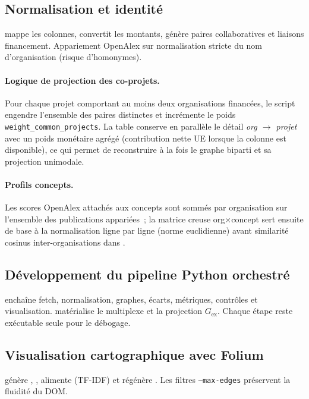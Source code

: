 \documentclass[12pt,a4paper,oneside]{article}
\begin{document}
\subsection{Normalisation et identité}
 mappe les colonnes, convertit les montants, génère paires collaboratives et liaisons financement. Appariement OpenAlex sur normalisation stricte du nom d'organisation (risque d'homonymes).

\paragraph{Logique de projection des co-projets.}
Pour chaque projet comportant au moins deux organisations financées, le script engendre l'ensemble des paires distinctes et incrémente le poids \texttt{weight\_common\_projects}. La table  conserve en parallèle le détail \emph{org $\rightarrow$ projet} avec un poids monétaire agrégé (contribution nette UE lorsque la colonne est disponible), ce qui permet de reconstruire à la fois le graphe biparti et sa projection unimodale.

\paragraph{Profils concepts.}
Les scores OpenAlex attachés aux concepts sont sommés par organisation sur l'ensemble des publications appariées~; la matrice creuse org$\times$concept sert ensuite de base à la normalisation ligne par ligne (norme euclidienne) avant similarité cosinus inter-organisations dans .


\subsection{Développement du pipeline Python orchestré}
 enchaîne fetch, normalisation, graphes, écarts, métriques, contrôles et visualisation.  matérialise le multiplexe et la projection $G_{\mathrm{ex}}$. Chaque étape reste exécutable seule pour le débogage.

\subsection{Visualisation cartographique avec Folium}
 génère , , alimente  (TF-IDF) et régénère . Les filtres \texttt{--max-edges} préservent la fluidité du DOM.
\end{document}

